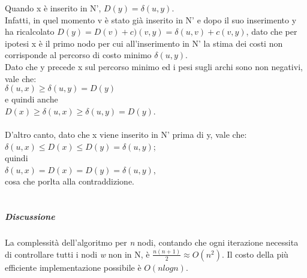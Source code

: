 Quando x è inserito in N', $ D(y) = \delta(u,y) $.\\
Infatti, in quel momento v è stato già inserito in N' e dopo il suo inserimento y ha ricalcolato $ D(y) = D(v)+c)(v,y) = \delta(u,v)+c(v,y) $, dato che per ipotesi x è il primo nodo per cui all'inserimento in N' la stima dei costi non corrisponde al percorso di costo minimo $ \delta(u,y) $.\\
Dato che y precede x sul percorso minimo ed i pesi sugli archi sono non negativi, vale che:\\
$ \delta(u,x)\geq\delta(u,y)=D(y) $\\
e quindi anche\\
$ D(x) \geq \delta(u,x) \geq \delta(u,y)=D(y) $.\\\\
D'altro canto, dato che x viene inserito in N' prima di y, vale che:\\
$ \delta(u,x) \leq D(x) \leq D(y) = \delta(u,y) $;\\
quindi\\
$ \delta(u,x)=D(x)=D(y)=\delta(u,y) $,\\
cosa che porlta alla contraddizione.\\\\
\subparagraph{Discussione}
La complessità dell'algoritmo per \textit{n} nodi, contando che ogni iterazione necessita di controllare tutti i nodi \textit{w} non in N, è $ \frac{n(n+1)}{2} \approx O(n^2) $. Il costo della più efficiente implementazione possibile è $ O(nlogn) $.